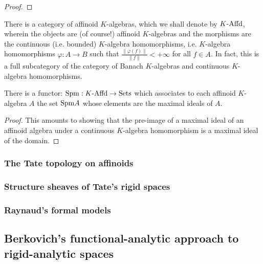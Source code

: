                 \begin{proof}
                    
                \end{proof}
            \begin{corollary}
                There is a category of affinoid $K$-algebras, which we shall denote by $K\text{-}\mathrm{Affd}$, wherein the objects are (of course!) affinoid $K$-algebras and the morphisms are the continuous (i.e. bounded) $K$-algebra homomorphisms, i.e. $K$-algebra homomorphisms $\varphi: A \to B$ such that $\frac{\|\varphi(f)\|}{\|f\|} < +\infty$ for all $f \in A$. In fact, this is a full subcategory of the category of Banach $K$-algebras and continuous $K$-algebra homomorphisms.
            \end{corollary}
            \begin{proposition} \label{prop: maximal_spectra_of_affinoid_algebras}
                There is a functor: $\mathrm{Spm}: K\text{-}\mathrm{Affd} \to \mathrm{Sets}$ which associates to each affinoid $K$-algebra $A$ the set $\mathrm{Spm} A$ whose elements are the maximal ideals of $A$. 
            \end{proposition}
                \begin{proof}
                    This amounts to showing that the pre-image of a maximal ideal of an affinoid algebra under a continuous $K$-algebra homomorphism is a maximal ideal of the domain. 
                \end{proof}
        
        \subsubsection{The Tate topology on affinoids}
        
        \subsubsection{Structure sheaves of Tate's rigid spaces}
    
    \subsubsection{Raynaud's formal models}
    
    \subsection{Berkovich's functional-analytic approach to rigid-analytic spaces}